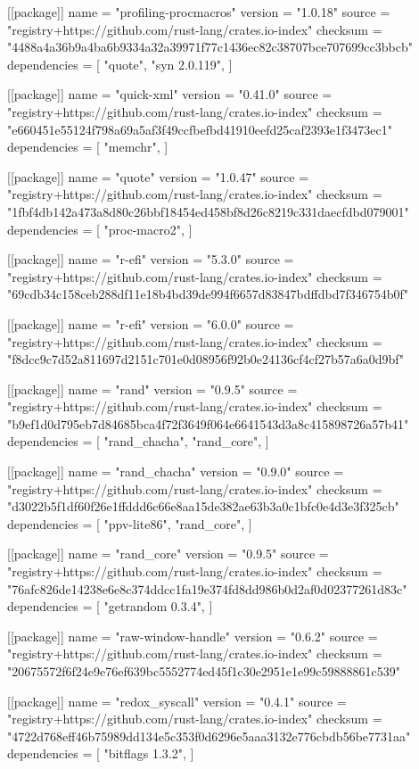 [[package]]
name = "profiling-procmacros"
version = "1.0.18"
source = "registry+https://github.com/rust-lang/crates.io-index"
checksum = "4488a4a36b9a4ba6b9334a32a39971f77c1436ec82c38707bce707699cc3bbcb"
dependencies = [
 "quote",
 "syn 2.0.119",
]

[[package]]
name = "quick-xml"
version = "0.41.0"
source = "registry+https://github.com/rust-lang/crates.io-index"
checksum = "e660451e55124f798a69a5af3f49ccfbefbd41910eefd25caf2393e1f3473ec1"
dependencies = [
 "memchr",
]

[[package]]
name = "quote"
version = "1.0.47"
source = "registry+https://github.com/rust-lang/crates.io-index"
checksum = "1fbf4db142a473a8d80c26bbf18454ed458bf8d26c8219c331daecfdbd079001"
dependencies = [
 "proc-macro2",
]

[[package]]
name = "r-efi"
version = "5.3.0"
source = "registry+https://github.com/rust-lang/crates.io-index"
checksum = "69cdb34c158ceb288df11e18b4bd39de994f6657d83847bdffdbd7f346754b0f"

[[package]]
name = "r-efi"
version = "6.0.0"
source = "registry+https://github.com/rust-lang/crates.io-index"
checksum = "f8dcc9c7d52a811697d2151c701e0d08956f92b0e24136cf4cf27b57a6a0d9bf"

[[package]]
name = "rand"
version = "0.9.5"
source = "registry+https://github.com/rust-lang/crates.io-index"
checksum = "b9ef1d0d795eb7d84685bca4f72f3649f064e6641543d3a8c415898726a57b41"
dependencies = [
 "rand_chacha",
 "rand_core",
]

[[package]]
name = "rand_chacha"
version = "0.9.0"
source = "registry+https://github.com/rust-lang/crates.io-index"
checksum = "d3022b5f1df60f26e1ffddd6c66e8aa15de382ae63b3a0c1bfc0e4d3e3f325cb"
dependencies = [
 "ppv-lite86",
 "rand_core",
]

[[package]]
name = "rand_core"
version = "0.9.5"
source = "registry+https://github.com/rust-lang/crates.io-index"
checksum = "76afc826de14238e6e8c374ddcc1fa19e374fd8dd986b0d2af0d02377261d83c"
dependencies = [
 "getrandom 0.3.4",
]

[[package]]
name = "raw-window-handle"
version = "0.6.2"
source = "registry+https://github.com/rust-lang/crates.io-index"
checksum = "20675572f6f24e9e76ef639bc5552774ed45f1c30e2951e1e99c59888861c539"

[[package]]
name = "redox_syscall"
version = "0.4.1"
source = "registry+https://github.com/rust-lang/crates.io-index"
checksum = "4722d768eff46b75989dd134e5c353f0d6296e5aaa3132e776cbdb56be7731aa"
dependencies = [
 "bitflags 1.3.2",
]

